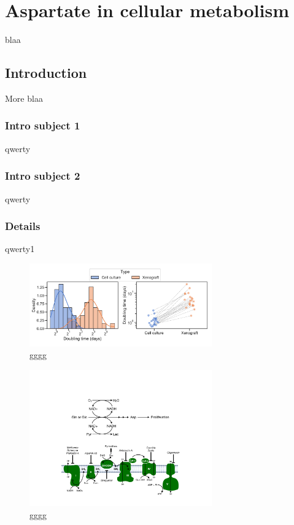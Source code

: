 \chapter{Aspartate in cellular metabolism}
blaa

\section{Introduction}
More blaa

\subsection{Intro subject 1}
qwerty

\subsection{Intro subject 2}
qwerty
\subsection{Details}
qwerty1


\begin{figure}
    \centering
    \includegraphics[width=0.70\textwidth]{figures/chap1/prlfr_contr.pdf}
    \caption[gggg]{
    gggg
    }
    \label{fig:ch1:prlfr_contr}
\end{figure}











\begin{figure}
    \centering
    \includegraphics[width=0.70\textwidth]{figures/chap1/redox_biomass.pdf}
    \caption[Biomass accumulation requires NAD+ regeneration]{
    gggg
    }
    \label{fig:ch1:redox_biomass}
\end{figure}







